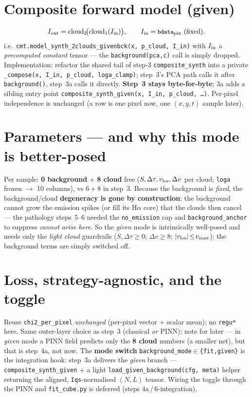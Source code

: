 \documentclass[10pt,a4paper]{article}
\newcommand{\co}[1]{{\small\texttt{#1}}}
\begin{document}
\section{Composite forward model (given)}

\[
I_{\rm out}=\mathrm{cloud}_2\!\big(\mathrm{cloud}_1(I_{\rm in})\big),\qquad I_{\rm in}=\co{bdata}_{\rm pix}\ \text{(fixed)} .
\]
i.e.\ \co{cmt.model\_synth\_2clouds\_givenbck(x, p\_cloud, I\_in)} with $I_{\rm in}$ a \emph{precomputed constant} tensor --- the \co{background(pca,c)} call is simply dropped. Implementation: refactor the shared tail of step-3 \co{composite\_synth} into a private \co{\_compose(x, I\_in, p\_cloud, loga\_clamp)}; step~3's PCA path calls it after \co{background()}, step~3a calls it directly. \textbf{Step~3 stays byte-for-byte}; 3a adds a sibling entry point \co{composite\_synth\_given(x, I\_in, p\_cloud, \ldots)}. Per-pixel independence is unchanged (a row is one pixel now, one $(x,y,t)$ sample later).

\section{Parameters --- and why this mode is better-posed}

Per sample: \textbf{0 background} $+$ \textbf{8 cloud} free ($S,\Delta\tau,v_{\rm los},\Delta v$ per cloud; \co{loga} frozen $\rightarrow$ 10 columns), vs $6{+}8$ in step~3. Because the background is \emph{fixed}, the background/cloud \textbf{degeneracy is gone by construction}: the background cannot grow the emission spikes (or fill its H$\alpha$ core) that the clouds then cancel --- the pathology steps~5--6 needed the \co{no\_emission} cap and \co{background\_anchor} to suppress \emph{cannot arise here}. So the \emph{given} mode is intrinsically well-posed and needs only the \emph{light cloud} guardrails ($S,\Delta\tau\!\ge\!0$; $\Delta v\!\ge\!8$; $|v_{\rm los}|\!\le\!v_{\max}$); the background terms are simply switched off.

\section{Loss, strategy-agnostic, and the toggle}

Reuse \co{chi2\_per\_pixel} \emph{unchanged} (per-pixel vector $+$ scalar mean); no \co{regu*} here. Same outer-layer choice as step~3 (classical \emph{or} PINN); note for later --- in \emph{given} mode a PINN field predicts only the \textbf{8 cloud} numbers (a smaller net), but that is step~4a, not now. The \textbf{mode switch} \co{background\_mode$\in$\{fit,given\}} is the integration hook: step~3a delivers the \emph{given} branch --- \co{composite\_synth\_given} $+$ a light \co{load\_given\_background(cfg, meta)} helper returning the aligned, \co{Iqs}-normalised $(N,L)$ tensor. Wiring the toggle through the PINN and \co{fit\_cube.py} is deferred (steps 4a\,/\,6-integration).
\end{document}
